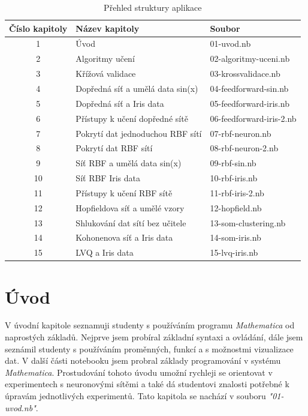\documentclass[11pt,twoside,a4paper]{book}
\begin{document}
\begin{center}
\begin{table}[h]
\begin{tabular}{|c|l|l|}
\hline 
Číslo kapitoly & Název kapitoly & Soubor \\ \hline
1 & Úvod & 01-uvod.nb \\ \hline
2 & Algoritmy učení & 02-algoritmy-uceni.nb \\ \hline
3 & Křížová validace & 03-krossvalidace.nb \\ \hline
4 & Dopředná síť a umělá data sin(x) & 04-feedforward-sin.nb \\ \hline
5 & Dopředná síť a Iris data & 05-feedforward-iris.nb \\ \hline
6 & Přístupy k učení dopředné sítě & 06-feedforward-iris-2.nb \\ \hline
7 & Pokrytí dat jednoduchou RBF sítí & 07-rbf-neuron.nb \\ \hline
8 & Pokrytí dat RBF sítí & 08-rbf-neuron-2.nb \\ \hline
9 & Síť RBF a umělá data sin(x) & 09-rbf-sin.nb \\ \hline
10 & Síť RBF  Iris data & 10-rbf-iris.nb \\ \hline
11 & Přístupy k učení RBF sítě & 11-rbf-iris-2.nb \\ \hline
12 & Hopfieldova síť a umělé vzory & 12-hopfield.nb \\ \hline
13 & Shlukování dat sítí bez učitele & 13-som-clustering.nb \\ \hline
14 & Kohonenova síť a Iris data & 14-som-iris.nb \\ \hline
15 & LVQ a Iris data & 15-lvq-iris.nb \\ \hline
\end{tabular}
\caption{Přehled struktury aplikace}
\label{tab:aplikace}
\end{table}
\end{center}

\section{Úvod}
V úvodní kapitole seznamuji studenty s používáním programu \textit{Mathematica} od naprostých základů. Nejprve jsem probíral základní syntaxi a ovládání, dále jsem seznámil studenty s používáním proměnných, funkcí a s možnostmi vizualizace dat. V další části notebooku jsem probral základy programování v systému \textit{Mathematica}. Prostudování tohoto úvodu umožní rychleji se orientovat v experimentech s neuronovými sítěmi a také dá studentovi znalosti potřebné k úpravám jednotlivých experimentů. Tato kapitola se nachází v souboru \textit{"01-uvod.nb"}.
\end{document}
